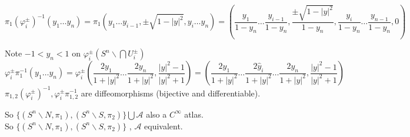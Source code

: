 \documentclass[11pt]{amsart}
\theoremstyle{definition}
\begin{document}
\begin{enumerate}
\[
\pi_1(\varphi_i^{\pm})^{-1}(y_1 \dots y_n) = \pi_1(y_1 \dots y_{i-1}, \pm \sqrt{ 1 - |y|^2 }, y_i \dots y_n) = \left( \frac{y_1 }{ 1 - y_n} \dots \frac{y_{i-1} }{ 1 - y_n}, \frac{ \pm \sqrt{ 1 - |y|^2 } }{ 1 - y_n } , \frac{y_i}{ 1 - y_n} \dots \frac{y_{n-1}}{ 1 - y_n }, 0 \right)
\]

Note $-1< y_n <1$ on $\varphi_i^{\pm}(S^n\backslash \bigcap U_i^{\pm})$
\[
\varphi_i^{\pm} \pi_1^{-1}(y_1 \dots y_n) = \varphi_i^{\pm}\left( \frac{ 2y_1}{ 1 + |y|^2} \dots \frac{2y_n}{ 1 + |y|^2} , \frac{|y|^2 - 1 }{ |y|^2 + 1 } \right) = \left( \frac{2y_1 }{ 1 + |y|^2} \dots \frac{ 2 \widehat{y}_i }{ 1 + |y|^2 } \dots \frac{ 2y_n }{ 1 + |y|^2 }, \frac{|y|^2 -1}{ |y|^2 + 1 } \right)
\]
$\pi_{1,2}(\varphi_i^{\pm})^{-1}, \varphi_i^{\pm}\pi_{1,2}^{-1}$ are diffeomorphisms (bijective and differentiable).

So $\lbrace(S^n\backslash N, \pi_1), (S^n\backslash S , \pi_2) \rbrace \bigcup \mathcal{A}$ also a $C^{\infty}$ atlas.  \\
So $\lbrace(S^n\backslash N, \pi_1), (S^n\backslash S , \pi_2) \rbrace$ ,  $\mathcal{A}$ equivalent.



\end{enumerate}
\end{document}
